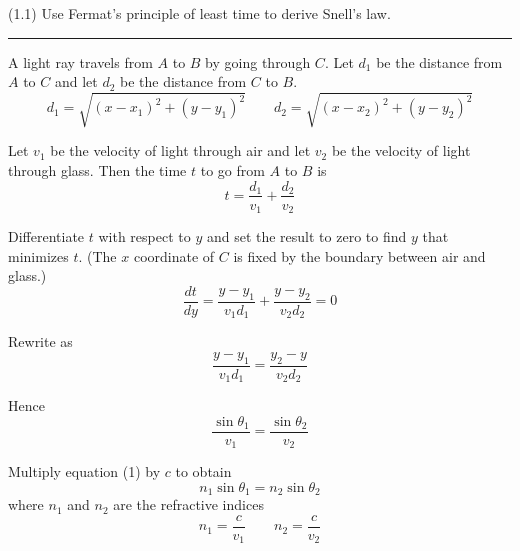 \documentclass[12pt]{article}
\begin{document}
(1.1)
Use Fermat's principle of least time to derive Snell's law.

\bigskip
\hrule

\begin{center}
\end{center}

A light ray travels from $A$ to $B$ by going through $C$.
Let $d_1$ be the distance from $A$ to $C$ and let $d_2$ be the distance from $C$ to $B$.
\begin{equation*}
d_1=\sqrt{(x-x_1)^2+(y-y_1)^2}\qquad
d_2=\sqrt{(x-x_2)^2+(y-y_2)^2}
\end{equation*}

Let $v_1$ be the velocity of light through air and let $v_2$ be the velocity of light through glass.
Then the time $t$ to go from $A$ to $B$ is
\begin{equation*}
t=\frac{d_1}{v_1}+\frac{d_2}{v_2}
\end{equation*}

Differentiate $t$ with respect to $y$ and set the result to zero to find $y$ that minimizes $t$.
(The $x$ coordinate of $C$ is fixed by the boundary between air and glass.)
\begin{equation*}
\frac{dt}{dy}=\frac{y-y_1}{v_1d_1}+\frac{y-y_2}{v_2d_2}=0
\end{equation*}

Rewrite as
\begin{equation*}
\frac{y-y_1}{v_1d_1}=\frac{y_2-y}{v_2d_2}
\end{equation*}

Hence
\begin{equation*}
\frac{\sin\theta_1}{v_1}=\frac{\sin\theta_2}{v_2}
\tag{1}
\end{equation*}

Multiply equation (1) by $c$ to obtain
\begin{equation*}
n_1\sin\theta_1=n_2\sin\theta_2
\end{equation*}
where $n_1$ and $n_2$ are the refractive indices
\begin{equation*}
n_1=\frac{c}{v_1}\qquad n_2=\frac{c}{v_2}
\end{equation*}
\end{document}
